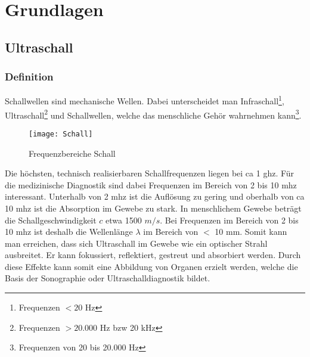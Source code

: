 \chapter{Grundlagen}
\section{Ultraschall}
\subsection{Definition}
Schallwellen sind mechanische Wellen. Dabei unterscheidet man Infraschall\footnote{Frequenzen $< 20$ Hz}, Ultraschall\footnote{Frequenzen $>20.000$ Hz \ac{bzw} 20 kHz} und Schallwellen, welche das menschliche Gehör wahrnehmen kann\footnote{Frequenzen von 20 bis 20.000 Hz}.
\begin{figure}[h]
		\centering
  		\texttt{[image: Schall]}  
  		\caption{Frequenzbereiche Schall}
  		\label{fig:Schall}
  	\end{figure}
Die höchsten, technisch realisierbaren Schallfrequenzen liegen bei \ac{ca} 1 \ac{ghz}. Für die medizinische Diagnostik sind dabei Frequenzen im Bereich von 2 bis 10 \ac{mhz} interessant. Unterhalb von 2 \ac{mhz} ist die Auflösung zu gering und oberhalb von \ac{ca} 10 \ac{mhz} ist die Absorption im Gewebe zu stark.\newline
In menschlichem Gewebe beträgt die Schallgeschwindigkeit $c$ etwa 1500 $m/s$. Bei Frequenzen im Bereich von 2 bis 10 \ac{mhz} ist deshalb die Wellenlänge $\lambda$ im Bereich von $<$ 10 mm. Somit kann man erreichen, dass sich Ultraschall im Gewebe wie ein optischer Strahl ausbreitet. Er kann fokussiert, reflektiert, gestreut und absorbiert werden. Durch diese Effekte kann somit eine Abbildung von Organen erzielt werden, welche die Basis der Sonographie oder Ultraschalldiagnostik bildet.%
\cite{suter2006}\cite{suter2009}\cite{suter2010}
%
